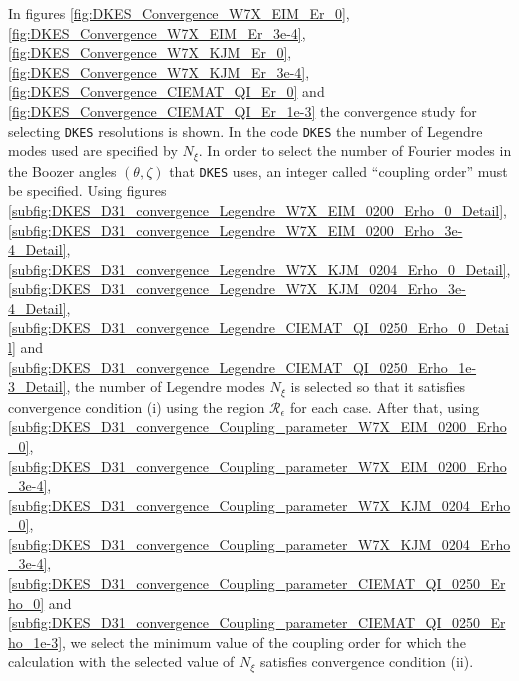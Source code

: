 \documentclass[10pt]{iopart}
\newcommand{\DKES}{{\texttt{DKES}}}
\begin{document}
In figures \ref{fig:DKES_Convergence_W7X_EIM_Er_0}, \ref{fig:DKES_Convergence_W7X_EIM_Er_3e-4}, \ref{fig:DKES_Convergence_W7X_KJM_Er_0}, \ref{fig:DKES_Convergence_W7X_KJM_Er_3e-4}, \ref{fig:DKES_Convergence_CIEMAT_QI_Er_0} and \ref{fig:DKES_Convergence_CIEMAT_QI_Er_1e-3} the convergence study for selecting {\DKES} resolutions is shown. In the code {\DKES} the number of Legendre modes used are specified by $N_\xi$. In order to select the number of Fourier modes in the Boozer angles $(\theta,\zeta)$ that {\DKES} uses, an integer called ``coupling order'' must be specified. Using figures \ref{subfig:DKES_D31_convergence_Legendre_W7X_EIM_0200_Erho_0_Detail}, \ref{subfig:DKES_D31_convergence_Legendre_W7X_EIM_0200_Erho_3e-4_Detail}, \ref{subfig:DKES_D31_convergence_Legendre_W7X_KJM_0204_Erho_0_Detail}, \ref{subfig:DKES_D31_convergence_Legendre_W7X_KJM_0204_Erho_3e-4_Detail}, \ref{subfig:DKES_D31_convergence_Legendre_CIEMAT_QI_0250_Erho_0_Detail} and \ref{subfig:DKES_D31_convergence_Legendre_CIEMAT_QI_0250_Erho_1e-3_Detail}, the number of Legendre modes $N_\xi$ is selected so that it satisfies convergence condition (i) using the region $\mathcal{R}_\epsilon$ for each case. After that, using \ref{subfig:DKES_D31_convergence_Coupling_parameter_W7X_EIM_0200_Erho_0}, \ref{subfig:DKES_D31_convergence_Coupling_parameter_W7X_EIM_0200_Erho_3e-4}, \ref{subfig:DKES_D31_convergence_Coupling_parameter_W7X_KJM_0204_Erho_0}, \ref{subfig:DKES_D31_convergence_Coupling_parameter_W7X_KJM_0204_Erho_3e-4}, \ref{subfig:DKES_D31_convergence_Coupling_parameter_CIEMAT_QI_0250_Erho_0} and \ref{subfig:DKES_D31_convergence_Coupling_parameter_CIEMAT_QI_0250_Erho_1e-3}, we select the minimum value of the coupling order for which the calculation with the selected value of $N_\xi$ satisfies convergence condition (ii).
\end{document}
